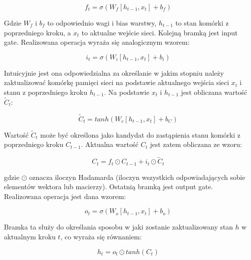 \documentclass[oneside, mag]{mgr}
\begin{document}
\begin{equation}
	f_t = \sigma( W_f [ h_{t-1}, x_t ] + b_f )
\end{equation}

Gdzie $W_f$ i $b_f$ to odpowiednio wagi i bias warstwy, $h_{t-1}$ to stan komórki z poprzedniego kroku, a $x_t$ to aktualne wejście sieci. Kolejną bramką jest input gate. Realizowana operacja wyraża się analogicznym wzorem:

\begin{equation}
	i_t = \sigma( W_i [ h_{t-1}, x_t ] + b_i )
\end{equation}

Intuicyjnie jest ona odpowiedzialna za określanie w jakim stopniu należy zaktualizować komórkę pamięci sieci na podstawie aktualnego wejścia sieci $x_t$ i stanu z poprzedniego kroku $h_{t-1}$. Na podstawie $x_t$ i $h_{t-1}$ jest obliczana wartość $\tilde{C}_t$:

\begin{equation}
	\tilde{C}_t = tanh( W_c [ h_{t-1}, x_t ] + b_C )
\end{equation}

Wartość $\tilde{C}_t$ może być określona jako kandydat do zastąpienia stanu komórki z poprzedniego kroku $C_{t-1}$. Aktualna wartość $C_t$ jest zatem obliczana ze wzoru:

\begin{equation}
	C_t = f_t \odot C_{t-1} + i_t \odot \tilde{C}_t
\end{equation}

gdzie $\odot$ oznacza iloczyn Hadamarda (iloczyn wszystkich odpowiadających sobie elementów wektora lub macierzy). Ostatnią bramką jest output gate. Realizowana operacja jest dana wzorem:

\begin{equation}
	o_t = \sigma( W_o [ h_{t-1}, x_t ] + b_o )
\end{equation}

Bramka ta służy do określania sposobu w jaki zostanie zaktualizowany stan $h$ w aktualnym kroku $t$, co wyraża się równaniem:

\begin{equation}
	h_t = o_t \odot tanh( C_t )
\end{equation}
\end{document}
